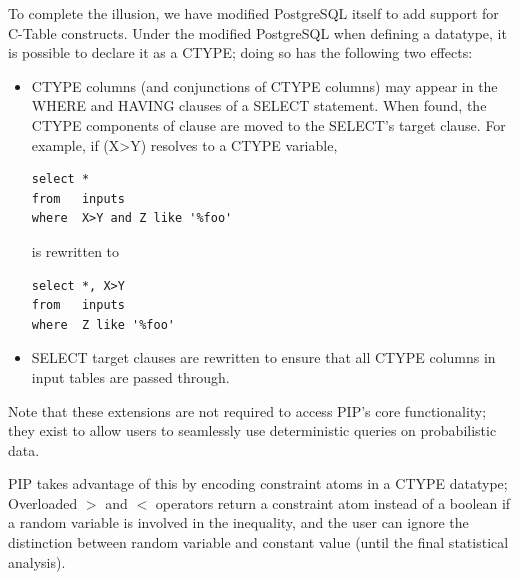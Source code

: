 
To complete the illusion, we have modified PostgreSQL itself to add support for C-Table constructs.  Under the modified PostgreSQL when defining a datatype, it is possible to declare it as a CTYPE; doing so has the following two effects:
\begin{itemize}
\item CTYPE columns (and conjunctions of CTYPE columns) may appear in the WHERE and HAVING clauses of a SELECT statement.  When found, the CTYPE components of clause are moved to the SELECT's target clause.  For example, if (X>Y) resolves to a CTYPE variable, 
\begin{verbatim}
select *
from   inputs
where  X>Y and Z like '%foo'
\end{verbatim}
is rewritten to
\begin{verbatim}
select *, X>Y
from   inputs
where  Z like '%foo'
\end{verbatim}

\item SELECT target clauses are rewritten to ensure that all CTYPE columns in input tables are passed through.
\end{itemize}

Note that these extensions are not required to access PIP's core functionality; they exist to allow users to seamlessly use deterministic queries on probabilistic data.

PIP takes advantage of this by encoding constraint atoms in a CTYPE datatype; Overloaded $>$ and $<$ operators return a constraint atom instead of a boolean if a random variable is involved in the inequality, and the user can ignore the distinction between random variable and constant value (until the final statistical analysis).

